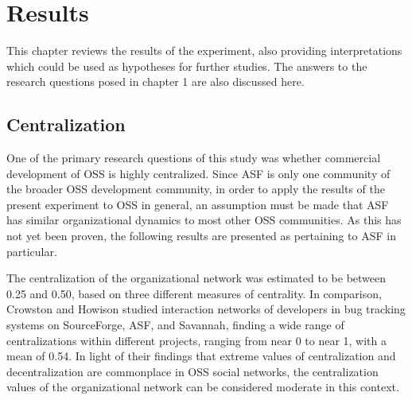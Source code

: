 \chapter{Results}
This chapter reviews the results of the experiment, also providing interpretations which could be used as hypotheses for further studies. The answers to the research questions posed in chapter 1 are also discussed here.

\section{Centralization}
One of the primary research questions of this study was whether commercial development of OSS is highly centralized. Since ASF is only one community of the broader OSS development community, in order to apply the results of the present experiment to OSS in general, an assumption must be made that ASF has similar organizational dynamics to most other OSS communities. As this has not yet been proven, the following results are presented as pertaining to ASF in particular.

The centralization of the organizational network was estimated to be between 0.25 and 0.50, based on three different measures of centrality. In comparison, Crowston and Howison\cite{Crowston2006} studied interaction networks of developers in bug tracking systems on SourceForge, ASF, and Savannah, finding a wide range of centralizations within different projects, ranging from near 0 to near 1, with a mean of 0.54. In light of their findings that extreme values of centralization and decentralization are commonplace in OSS social networks, the centralization values of the organizational network can be considered moderate in this context.

